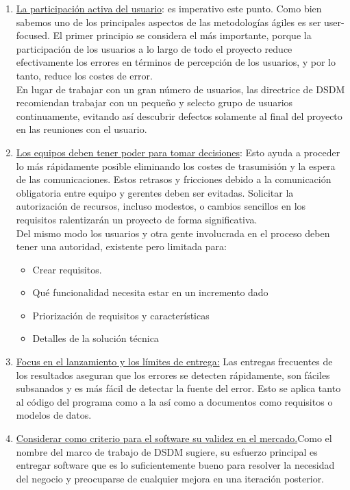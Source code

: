 \documentclass[12pt,a4paper]{article}
\begin{document}
\begin{itemize}
\begin{enumerate}
	\item \underline{La participación activa del usuario}: es imperativo este punto. Como bien sabemos uno de los principales aspectos de las metodologías ágiles es ser user-focused. El primer principio se considera el más importante, porque la participación de los usuarios a lo largo de todo el proyecto reduce efectivamente los errores en términos de percepción de los usuarios, y por lo tanto, reduce los costes de error. \\


En lugar de trabajar con un gran número de usuarios, las directrice de  DSDM  recomiendan trabajar con un pequeño y selecto grupo de usuarios continuamente, evitando así descubrir defectos solamente al final del proyecto en las reuniones con el usuario.\\


\item \underline{Los equipos deben tener poder para tomar decisiones}: Esto ayuda a proceder lo más rápidamente posible eliminando los costes de trasumisión y la espera de las comunicaciones. Estos retrasos y fricciones debido a la comunicación obligatoria entre equipo y gerentes deben ser evitadas. Solicitar
la autorización de recursos, incluso modestos, o cambios sencillos en los requisitos ralentizarán un proyecto de forma significativa.\\

 Del mismo modo los usuarios y otra gente involucrada en el proceso deben tener una autoridad, existente pero limitada para:
\begin{itemize}
	\item  Crear requisitos.
    \item Qué funcionalidad necesita estar en un incremento dado
    \item Priorización de requisitos y características
    \item Detalles de la solución técnica
\end{itemize}


\item \underline{Focus en el lanzamiento y los límites de entrega:} Las entregas frecuentes de los resultados aseguran que los errores se detecten rápidamente, son fáciles subsanados y es más fácil de detectar la fuente del error. Esto se aplica tanto al código del programa como a la
así como a documentos como requisitos o modelos de datos.


\item \underline{Considerar como criterio para el software su validez en el mercado.}Como el nombre del marco de trabajo de DSDM sugiere, su esfuerzo principal es entregar
software que es lo suficientemente bueno para resolver la necesidad del negocio y preocuparse de cualquier mejora en una iteración posterior.


\end{enumerate}
\end{itemize}
\end{document}
